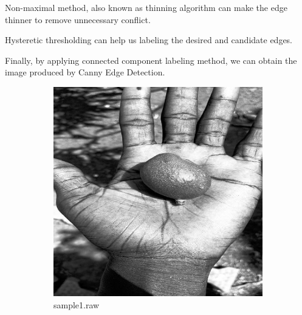 \documentclass{article}
\begin{document}
\begin{enumerate}[label=(\alph*)]
    Non-maximal method, also known as thinning algorithm can make the edge thinner to remove unnecessary conflict.

    Hysteretic thresholding can help us labeling the desired and candidate edges.

    Finally, by applying connected component labeling method, we can obtain the image produced by Canny Edge Detection.

    \begin{figure}[!htb]
        \centering
        \begin{subfigure}[b]{0.3\textwidth}
            \includegraphics[width=\textwidth]{img/I1.png}
            \caption{sample1.raw}
        \end{subfigure}
        ~
        \begin{subfigure}[b]{0.3\textwidth}

\end{subfigure}
\end{figure}
\end{enumerate}
\end{document}
